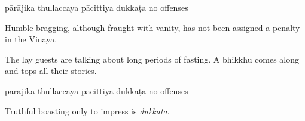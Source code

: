 \begin{exam}{\autoExamName}
\begin{problem*}
\begin{parts}
  \bigskip

  \begin{answers}{5}
    \bChoices
     pārājika\eAns
     thullaccaya\eAns
     pācittiya\eAns
     dukkaṭa\eAns
     no offenses\eAns
    \eChoices
  \end{answers}

  \begin{solution}
    Humble-bragging, although fraught with vanity, has not been assigned a penalty in the Vinaya.
  \end{solution}

  \bigskip

\item The lay guests are talking about long periods of fasting. A bhikkhu comes
  along and tops all their stories.

  \bigskip

  \begin{answers}{5}
    \bChoices
     pārājika\eAns
     thullaccaya\eAns
     pācittiya\eAns
     dukkaṭa\eAns
     no offenses\eAns
    \eChoices
  \end{answers}

  \begin{solution}
    Truthful boasting only to impress is \emph{dukkata}.
  \end{solution}

\end{parts}

\end{problem*}

\end{exam}

